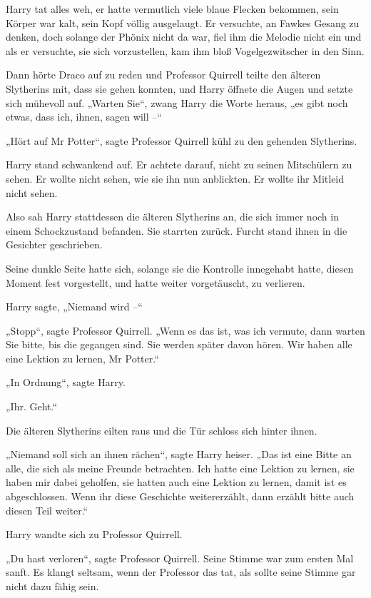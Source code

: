 {Harry tat alles weh, er hatte vermutlich viele blaue Flecken bekommen, sein Körper war kalt, sein Kopf völlig ausgelaugt. Er versuchte, an Fawkes Gesang zu denken, doch solange der Phönix nicht da war, fiel ihm die Melodie nicht ein und als er versuchte, sie sich vorzustellen, kam ihm bloß Vogelgezwitscher in den Sinn.

Dann hörte Draco auf zu reden und Professor Quirrell teilte den älteren Slytherins mit, dass sie gehen konnten, und Harry öffnete die Augen und setzte sich mühevoll auf. „Warten Sie“, zwang Harry die Worte heraus, „es gibt noch etwas, dass ich, ihnen, sagen will --“

„Hört auf Mr Potter“, sagte Professor Quirrell kühl zu den gehenden Slytherins.

Harry stand schwankend auf. Er achtete darauf, nicht zu seinen Mitschülern zu sehen. Er wollte nicht sehen, wie sie ihn nun anblickten. Er wollte ihr Mitleid nicht sehen.

Also sah Harry stattdessen die älteren Slytherins an, die sich immer noch in einem Schockzustand befanden. Sie starrten zurück. Furcht stand ihnen in die Gesichter geschrieben.

Seine dunkle Seite hatte sich, solange sie die Kontrolle innegehabt hatte, diesen Moment fest vorgestellt, und hatte weiter vorgetäuscht, zu verlieren.

Harry sagte, „Niemand wird --“

„Stopp“, sagte Professor Quirrell. „Wenn es das ist, was ich vermute, dann warten Sie bitte, bis die gegangen sind. Sie werden später davon hören. Wir haben alle eine Lektion zu lernen, Mr Potter.“

„In Ordnung“, sagte Harry.

„Ihr. Geht.“

Die älteren Slytherins eilten raus und die Tür schloss sich hinter ihnen.

„Niemand soll sich an ihnen rächen“, sagte Harry heiser. „Das ist eine Bitte an alle, die sich als meine Freunde betrachten. Ich hatte eine Lektion zu lernen, sie haben mir dabei geholfen, sie hatten auch eine Lektion zu lernen, damit ist es abgeschlossen. Wenn ihr diese Geschichte weitererzählt, dann erzählt bitte auch diesen Teil weiter.“

Harry wandte sich zu Professor Quirrell.

„Du hast verloren“, sagte Professor Quirrell. Seine Stimme war zum ersten Mal sanft. Es klangt seltsam, wenn der Professor das tat, als sollte seine Stimme gar nicht dazu fähig sein.

}
